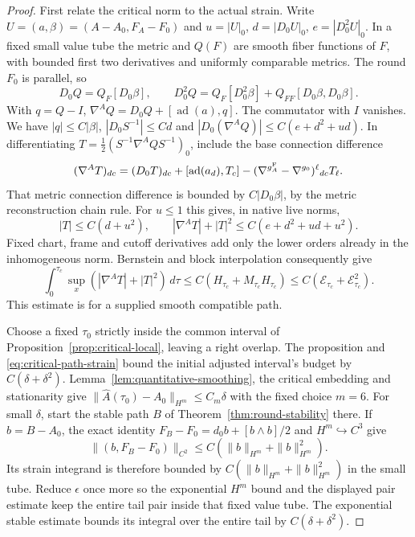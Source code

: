 \documentclass[11pt]{article}
\numberwithin{equation}{section}
\theoremstyle{definition}
\theoremstyle{remark}
\begin{document}
\begin{proof}
First relate the critical norm to the actual strain.
Write $U=(a,\beta)=(A-A_0,F_A-F_0)$ and
$u=|U|_0$, $d=|D_0U|_0$, $e=|D_0^2U|_0$.
In a fixed small value tube the metric and $Q(F)$
are smooth fiber functions of $F$, with bounded
first two derivatives and uniformly comparable
metrics. The round $F_0$ is parallel, so
\[
 D_0Q=Q_F[D_0\beta],\qquad
 D_0^2Q=Q_F[D_0^2\beta]+Q_{FF}[D_0\beta,D_0\beta].
\]
With $q=Q-I$,
$\nabla^AQ=D_0Q+[\operatorname{ad}(a),q]$.
The commutator with $I$ vanishes. We have
$|q|\le C|\beta|$, $|D_0S^{-1}|\le Cd$ and
$|D_0(\nabla^AQ)|\le C(e+d^2+ud)$.
In differentiating
$T=\tfrac12(S^{-1}\nabla^AQ S^{-1})_0$, include
the base connection difference
\[
 (\nabla^AT)_{dc}=(D_0T)_{dc}
       +[\operatorname{ad}(a_d),T_c]
       -(\nabla^{g_A^{\rm F}}-\nabla^{g_0})^\ell{}_{dc}T_\ell.
\]
That metric connection difference is bounded by
$C|D_0\beta|$, by the metric reconstruction chain
rule. For $u\le1$ this gives, in native live norms,
\[
 |T|\le C(d+u^2),\qquad
 |\nabla^AT|+|T|^2\le C(e+d^2+ud+u^2).
\]
Fixed chart, frame and cutoff derivatives add only
the lower orders already in the inhomogeneous norm.
Bernstein and block interpolation consequently give
\begin{equation}\label{eq:critical-path-strain}
 \int_0^{\tau_c}\sup_x(|\nabla^AT|+|T|^2)\,d\tau
       \le C(H_{\tau_c}+M_{\tau_c}H_{\tau_c})
       \le C(\mathcal E_{\tau_c}+\mathcal E_{\tau_c}^2).
\end{equation}
This estimate is for a supplied smooth compatible path.

Choose a fixed $\tau_0$ strictly inside the common
interval of Proposition~\ref{prop:critical-local},
leaving a right overlap. The proposition and
\eqref{eq:critical-path-strain} bound the initial
adjusted interval's budget by $C(\delta+\delta^2)$.
Lemma~\ref{lem:quantitative-smoothing}, the critical
embedding and stationarity give
$\|\widehat A(\tau_0)-A_0\|_{H^m}\le C_m\delta$
with the fixed choice $m=6$.
For small $\delta$, start the stable path $B$ of
Theorem~\ref{thm:round-stability} there.
If $b=B-A_0$, the exact identity
$F_B-F_0=d_0b+[b\wedge b]/2$ and $H^m\hookrightarrow C^3$
give
\[
 \|(b,F_B-F_0)\|_{C^2}\le
 C(\|b\|_{H^m}+\|b\|_{H^m}^2).
\]
Its strain integrand is therefore bounded by
$C(\|b\|_{H^m}+\|b\|_{H^m}^2)$ in the small tube.
Reduce $\epsilon$ once more so the exponential
$H^m$ bound and the displayed pair estimate keep
the entire tail pair inside that fixed value tube.
The exponential stable estimate bounds its integral
over the entire tail by $C(\delta+\delta^2)$.


\end{proof}
\end{document}
